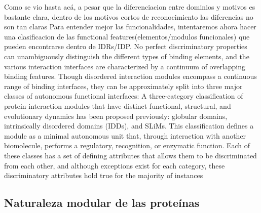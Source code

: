 % 
Como se vio hasta acá, a pesar que la diferenciacion entre dominios y motivos es bastante clara, dentro de los motivos cortos de reconocimiento las diferencias no son tan claras
Para entender mejor las funcionalidades, intentaremos ahora hacer una clasificacion de las functional features(elementos/modulos funcionales) que pueden encontrarse dentro de IDRs/IDP.
No perfect discriminatory properties can unambiguously distinguish the different types of binding elements, and the various interaction interfaces are characterized by a continuum of overlapping
binding features. 
Though disordered interaction modules encompass a continuous range of binding interfaces, they can be approximately split into three major classes of autonomous functional interfaces: 
A three-category classification of protein interaction modules that have distinct functional, structural, and evolutionary dynamics has
been proposed previously: globular domains, intrinsically disordered domains (IDDs), and SLiMs.  This classification
defines a module as a minimal autonomous unit that, through interaction with another biomolecule, performs a regulatory,
recognition, or enzymatic function. Each of these classes has a set of defining attributes that allows them to be discriminated
from each other, and although exceptions exist for each category, these discriminatory attributes hold true for the
majority of instances



































\subsection{Naturaleza modular de las proteínas}


